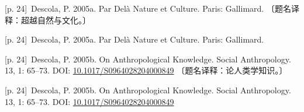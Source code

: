 \documentclass[10pt,a4paper]{article}
\begin{document}
\noindent\begin{minipage}{\textwidth}\begin{minipage}[t]{\dimexpr.5\textwidth-4mm\relax}\noindent\begin{minipage}[t]{\linewidth}{\scriptsize\color{gray} [p. 24]}\ Descola, P. 2005a. Par Delà Nature et Culture. Paris: Gallimard. 〔题名译释：超越自然与文化。〕\par\end{minipage}\par\end{minipage}\hfill\begin{minipage}[t]{\dimexpr.5\textwidth-4mm\relax}\noindent\begin{minipage}[t]{\linewidth}{\scriptsize\color{gray} [p. 24]}\ Descola, P. 2005a. Par Delà Nature et Culture. Paris: Gallimard.\par\end{minipage}\par\end{minipage}\end{minipage}\par
\noindent\begin{minipage}{\textwidth}\begin{minipage}[t]{\dimexpr.5\textwidth-4mm\relax}\noindent\begin{minipage}[t]{\linewidth}{\scriptsize\color{gray} [p. 24]}\ Descola, P. 2005b. On Anthropological Knowledge. Social Anthropology. 13, 1: 65–73. DOI: \url{10.1017/S0964028204000849} 〔题名译释：论人类学知识。〕\par\end{minipage}\par\end{minipage}\hfill\begin{minipage}[t]{\dimexpr.5\textwidth-4mm\relax}\noindent\begin{minipage}[t]{\linewidth}{\scriptsize\color{gray} [p. 24]}\ Descola, P. 2005b. On Anthropological Knowledge. Social Anthropology. 13, 1: 65–73. DOI: \url{10.1017/S0964028204000849}\par\end{minipage}\par\end{minipage}\end{minipage}\par
\end{document}
